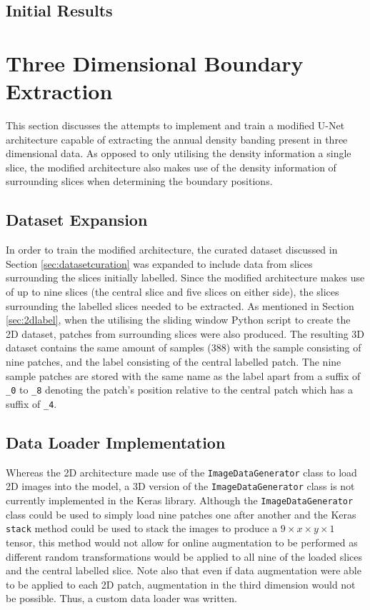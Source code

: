 \subsection{Initial Results}

\newpage

\section{Three Dimensional Boundary Extraction}
\label{sec:threedimension}

This section discusses the attempts to implement and train a modified U-Net architecture capable of extracting the annual density banding present in three dimensional data. As opposed to only utilising the density information a single slice, the modified architecture also makes use of the density information of surrounding slices when determining the boundary positions.

\subsection{Dataset Expansion}

In order to train the modified architecture, the curated dataset discussed in Section \ref{sec:datasetcuration} was expanded to include data from slices surrounding the slices initially labelled. Since the modified architecture makes use of up to nine slices (the central slice and five slices on either side), the slices surrounding the labelled slices needed to be extracted. As mentioned in Section \ref{sec:2dlabel}, when the utilising the sliding window Python script to create the 2D dataset, patches from surrounding slices were also produced. The resulting 3D dataset contains the same amount of samples (388) with the sample consisting of nine patches, and the label consisting of the central labelled patch. The nine sample patches are stored with the same name as the label apart from a suffix of \texttt{\_0} to \texttt{\_8} denoting the patch's position relative to the central patch which has a suffix of \texttt{\_4}.

\subsection{Data Loader Implementation}

Whereas the 2D architecture made use of the \texttt{ImageDataGenerator} class to load 2D images into the model, a 3D version of the \texttt{ImageDataGenerator} class is not currently implemented in the Keras library. Although the \texttt{ImageDataGenerator} class could be used to simply load nine patches one after another and the Keras \texttt{stack} method could be used to stack the images to produce a $9 \times x \times y \times 1$ tensor, this method would not allow for online augmentation to be performed as different random transformations would be applied to all nine of the loaded slices and the central labelled slice. Note also that even if data augmentation were able to be applied to each 2D patch, augmentation in the third dimension would not be possible. Thus, a custom data loader was written.

